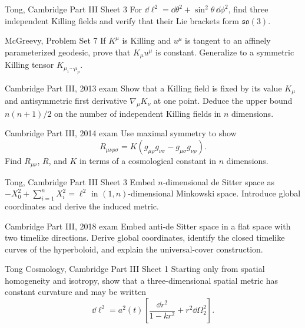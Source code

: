 \begin{exercises}

\begin{exercise}{Tong, Cambridge Part III Sheet 3}
For
\(\dd\ell^2=\dd\theta^2+\sin^2\theta\,\dd\phi^2\), find three independent
Killing fields and verify that their Lie brackets form
\(\mathfrak{so}(3)\).
\end{exercise}

\begin{exercise}{McGreevy, Problem Set 7}
If \(K^\mu\) is Killing and \(u^\mu\) is tangent to an affinely parameterized
geodesic, prove that \(K_\mu u^\mu\) is constant.  Generalize to a symmetric
Killing tensor \(K_{\mu_1\cdots\mu_p}\).
\end{exercise}

\begin{exercise}{Cambridge Part III, 2013 exam}
Show that a Killing field is fixed by its value \(K_\mu\) and antisymmetric
first derivative \(\nabla_\mu K_\nu\) at one point.  Deduce the upper bound
\(n(n+1)/2\) on the number of independent Killing fields in \(n\) dimensions.
\end{exercise}

\begin{exercise}{Cambridge Part III, 2014 exam}
Use maximal symmetry to show
\[
R_{\mu\nu\rho\sigma}
=K(g_{\mu\rho}g_{\nu\sigma}-g_{\mu\sigma}g_{\nu\rho}).
\]
Find \(R_{\mu\nu}\), \(R\), and \(K\) in terms of a cosmological constant in
\(n\) dimensions.
\end{exercise}

\begin{exercise}{Tong, Cambridge Part III Sheet 3}
Embed \(n\)-dimensional de Sitter space as
\(-X_0^2+\sum_{i=1}^nX_i^2=\ell^2\) in \((1,n)\)-dimensional Minkowski space.
Introduce global coordinates and derive the induced metric.
\end{exercise}

\begin{exercise}{Cambridge Part III, 2018 exam}
Embed anti-de Sitter space in a flat space with two timelike directions.
Derive global coordinates, identify the closed timelike curves of the
hyperboloid, and explain the universal-cover construction.
\end{exercise}

\begin{exercise}{Tong Cosmology, Cambridge Part III Sheet 1}
Starting only from spatial homogeneity and isotropy, show that a
three-dimensional spatial metric has constant curvature and may be written
\[
\dd\ell^2=a^2(t)\left[
\frac{\dd r^2}{1-kr^2}+r^2\dd\Omega_2^2\right].
\]
\end{exercise}


\end{exercises}
